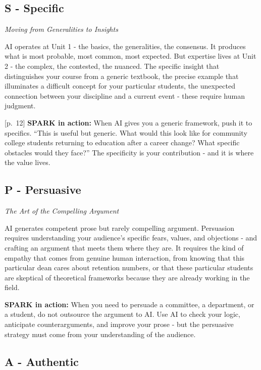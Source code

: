\documentclass[
  letterpaper,
  DIV=11,
  numbers=noendperiod]{scrreprt}
\begin{document}
\subsection{S - Specific}\label{s---specific}

\emph{Moving from Generalities to Insights}

AI operates at Unit 1 - the basics, the generalities, the consensus. It
produces what is most probable, most common, most expected. But
expertise lives at Unit 2 - the complex, the contested, the nuanced. The
specific insight that distinguishes your course from a generic textbook,
the precise example that illuminates a difficult concept for your
particular students, the unexpected connection between your discipline
and a current event - these require human judgment.

{[}p.~12{]} \textbf{SPARK in action:} When AI gives you a generic
framework, push it to specifics. ``This is useful but generic. What
would this look like for community college students returning to
education after a career change? What specific obstacles would they
face?'' The specificity is your contribution - and it is where the value
lives.

\subsection{P - Persuasive}\label{p---persuasive}

\emph{The Art of the Compelling Argument}

AI generates competent prose but rarely compelling argument. Persuasion
requires understanding your audience's specific fears, values, and
objections - and crafting an argument that meets them where they are. It
requires the kind of empathy that comes from genuine human interaction,
from knowing that this particular dean cares about retention numbers, or
that these particular students are skeptical of theoretical frameworks
because they are already working in the field.

\textbf{SPARK in action:} When you need to persuade a committee, a
department, or a student, do not outsource the argument to AI. Use AI to
check your logic, anticipate counterarguments, and improve your prose -
but the persuasive strategy must come from your understanding of the
audience.

\subsection{A - Authentic}\label{a---authentic}
\end{document}
